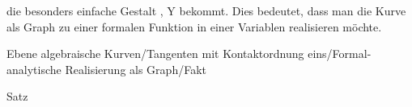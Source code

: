  {  }


die besonders einfache Gestalt   {  ,  }  { Y \mapsto {}   }{ } bekommt. Dies bedeutet, dass man die Kurve als Graph zu einer formalen Funktion in einer Variablen realisieren möchte.



{Ebene algebraische Kurven/Tangenten mit Kontaktordnung eins/Formal-analytische Realisierung als Graph/Fakt}

{Satz}

{}

{


\faktsituation {}

}
